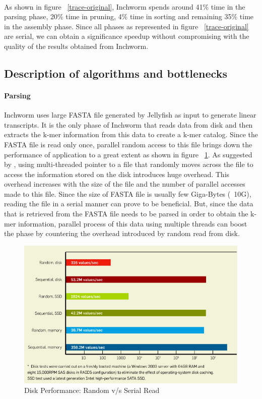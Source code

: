 \label{key}\documentclass[bachinf, english ,zihtitle,final,hyperref,utf8]{zihpub}
\begin{document}
\paragraph{}
As shown in figure ~\ref{trace-original}, Inchworm spends around 41\% time in the parsing phase, 20\% time in pruning, 4\% time in sorting and remaining 35\% time in the assembly phase. Since all phases as represented in figure ~\ref{trace-original} are serial, we can obtain a significance speedup without compromising with the quality of the results obtained from Inchworm.
\subsection{Description of algorithms and bottlenecks}
\paragraph{Parsing} 
Inchworm uses large FASTA file generated by Jellyfish as input to generate linear transcripts. It is the only phase of Inchworm that reads data from disk and then extracts the k-mer information from this data to create a k-mer catalog. Since the FASTA file is read only once, parallel random access to this file brings down the performance of application to a great extent as shown in figure ~\ref{disk}. As suggested by \cite{Jacobs}, using multi-threaded pointer to a file that randomly moves across the file to access the information stored on the disk introduces huge overhead. This overhead increases with the size of the file and the number of parallel accesses made to this file. Since the size of FASTA file is usually few Giga-Bytes (~10G), reading the file in a serial manner can prove to be beneficial. But, since the data that is retrieved from the FASTA file needs to be parsed in order to obtain the k-mer information, parallel process of this data using multiple threads can boost the phase by countering the overhead introduced by random read from disk. 
\begin{figure}[h]
\center
\includegraphics[scale=0.35]{disk}
\caption{Disk Performance: Random v/s Serial Read}
\label{disk}
\end{figure}
\end{document}
